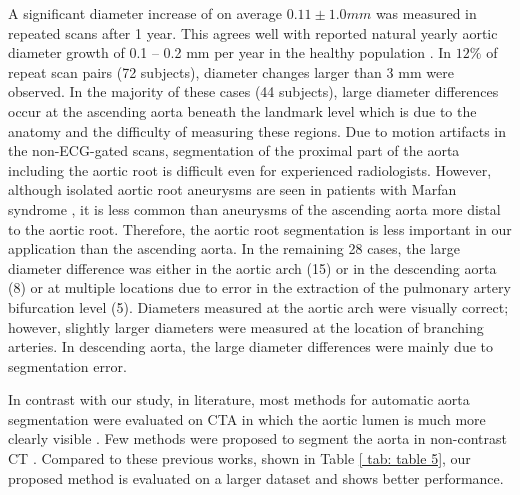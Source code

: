 A significant diameter increase of on average $0.11 \pm 1.0 mm$ was measured in repeated scans after 1 year. This agrees well with reported natural yearly aortic diameter growth of 0.1 – 0.2 mm per year in the healthy population \autocite{kalsch2013body, davies2002yearly}. In $12\%$ of repeat scan pairs (72 subjects), diameter changes larger than 3 mm were observed. In the majority of these cases (44 subjects), large diameter differences occur at the ascending aorta beneath the landmark level which is due to the anatomy and the difficulty of measuring these regions. Due to motion artifacts in the non-ECG-gated scans, segmentation of the proximal part of the aorta including the aortic root is difficult even for experienced radiologists. However, although isolated aortic root aneurysms are seen in patients with Marfan syndrome \autocite{authors20142014}, it is less common than aneurysms of the ascending aorta more distal to the aortic root. Therefore, the aortic root segmentation is less important in our application than the ascending aorta. In the remaining 28 cases, the large diameter difference was either in the aortic arch (15) or in the descending aorta (8) or at multiple locations due to error in the extraction of the pulmonary artery bifurcation level (5). Diameters measured at the aortic arch were visually correct; however, slightly larger diameters were measured at the location of branching arteries. In descending aorta, the large diameter differences were mainly due to segmentation error.


In contrast with our study, in literature, most methods for automatic aorta segmentation were evaluated on CTA in which the aortic lumen is much more clearly visible \autocite{gao2017quantification, entezari2013analysis, elattar2014automatic, ecabert2011segmentation, biesdorf2012segmentation}. Few methods were proposed to segment the aorta in non-contrast CT \autocite{kitasaka2002automated, avila2013segmentation, kurugol2015automated, isgum2009multi, xie2014automated}. Compared to these previous works, shown in Table \cref{ tab: table 5}, our proposed method is evaluated on a larger dataset and shows better performance.


